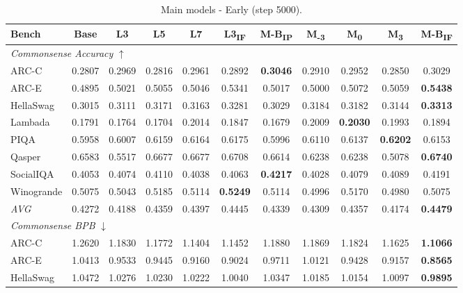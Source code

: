 \begin{table}[htbp]
\centering
\setlength{\tabcolsep}{2.5pt}
\caption{Main models - Early (step 5000).}
\label{tab:main_early}
\begin{tabular}{lcccccccccc}
\toprule
Bench & Base & L3 & L5 & L7 & L3\textsubscript{IF} & M-B\textsubscript{IP} & M\textsubscript{-3} & M\textsubscript{0} & M\textsubscript{3} & M-B\textsubscript{IF} \\
\midrule
\multicolumn{11}{l}{\textit{Commonsense Accuracy} $\uparrow$} \\
ARC-C & 0.2807 & 0.2969 & 0.2816 & 0.2961 & 0.2892 & \textbf{0.3046} & 0.2910 & 0.2952 & 0.2850 & 0.3029 \\
ARC-E & 0.4895 & 0.5021 & 0.5055 & 0.5046 & 0.5341 & 0.5017 & 0.5000 & 0.5072 & 0.5059 & \textbf{0.5438} \\
HellaSwag & 0.3015 & 0.3111 & 0.3171 & 0.3163 & 0.3281 & 0.3029 & 0.3184 & 0.3182 & 0.3144 & \textbf{0.3313} \\
Lambada & 0.1791 & 0.1764 & 0.1704 & 0.2014 & 0.1847 & 0.1679 & 0.2009 & \textbf{0.2030} & 0.1993 & 0.1894 \\
PIQA & 0.5958 & 0.6007 & 0.6159 & 0.6164 & 0.6175 & 0.5996 & 0.6110 & 0.6137 & \textbf{0.6202} & 0.6153 \\
Qasper & 0.6583 & 0.5517 & 0.6677 & 0.6677 & 0.6708 & 0.6614 & 0.6238 & 0.6238 & 0.5078 & \textbf{0.6740} \\
SocialIQA & 0.4053 & 0.4074 & 0.4110 & 0.4038 & 0.4063 & \textbf{0.4217} & 0.4028 & 0.4079 & 0.4089 & 0.4191 \\
Winogrande & 0.5075 & 0.5043 & 0.5185 & 0.5114 & \textbf{0.5249} & 0.5114 & 0.4996 & 0.5170 & 0.4980 & 0.5075 \\
\textit{AVG} & 0.4272 & 0.4188 & 0.4359 & 0.4397 & 0.4445 & 0.4339 & 0.4309 & 0.4357 & 0.4174 & \textbf{0.4479} \\
\midrule
\multicolumn{11}{l}{\textit{Commonsense BPB} $\downarrow$} \\
ARC-C & 1.2620 & 1.1830 & 1.1772 & 1.1404 & 1.1452 & 1.1880 & 1.1869 & 1.1824 & 1.1625 & \textbf{1.1066} \\
ARC-E & 1.0413 & 0.9533 & 0.9445 & 0.9160 & 0.9024 & 0.9711 & 1.0121 & 0.9428 & 0.9157 & \textbf{0.8565} \\
HellaSwag & 1.0472 & 1.0276 & 1.0230 & 1.0222 & 1.0040 & 1.0347 & 1.0185 & 1.0154 & 1.0097 & \textbf{0.9895} \\

\end{tabular}
\end{table}
